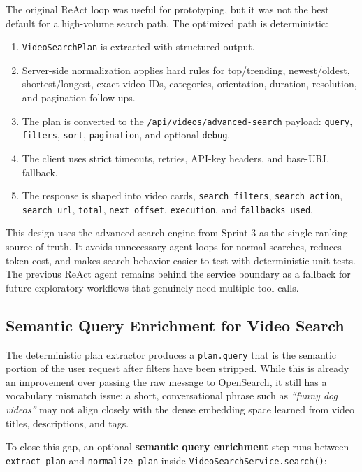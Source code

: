 The original ReAct loop was useful for prototyping, but it was not the best default for a
high-volume search path. The optimized path is deterministic:

\begin{enumerate}
  \item \texttt{VideoSearchPlan} is extracted with structured output.
  \item Server-side normalization applies hard rules for top/trending, newest/oldest,
    shortest/longest, exact video IDs, categories, orientation, duration, resolution, and
    pagination follow-ups.
  \item The plan is converted to the \texttt{/api/videos/advanced-search} payload:
    \texttt{query}, \texttt{filters}, \texttt{sort}, \texttt{pagination}, and optional
    \texttt{debug}.
  \item The client uses strict timeouts, retries, API-key headers, and base-URL fallback.
  \item The response is shaped into video cards, \texttt{search\_filters},
    \texttt{search\_action}, \texttt{search\_url}, \texttt{total}, \texttt{next\_offset},
    \texttt{execution}, and \texttt{fallbacks\_used}.
\end{enumerate}

This design uses the advanced search engine from Sprint 3 as the single ranking source of truth.
It avoids unnecessary agent loops for normal searches, reduces token cost, and makes search
behavior easier to test with deterministic unit tests. The previous ReAct agent remains behind the
service boundary as a fallback for future exploratory workflows that genuinely need multiple tool
calls.

\subsection{Semantic Query Enrichment for Video Search}

The deterministic plan extractor produces a \texttt{plan.query} that is the semantic portion of
the user request after filters have been stripped. While this is already an improvement over
passing the raw message to OpenSearch, it still has a vocabulary mismatch issue: a short,
conversational phrase such as \emph{``funny dog videos''} may not align closely with the dense
embedding space learned from video titles, descriptions, and tags.

To close this gap, an optional \textbf{semantic query enrichment} step runs between
\texttt{extract\_plan} and \texttt{normalize\_plan} inside \texttt{VideoSearchService.search()}:

